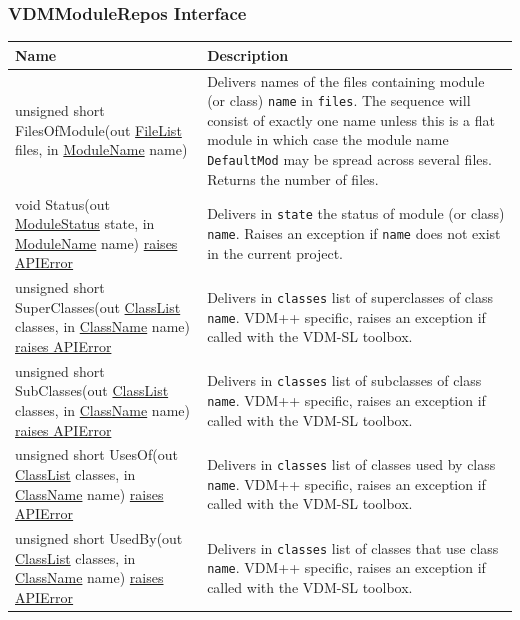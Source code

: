 \documentclass[\pformat,12pt]{article}
\newcommand{\vdmsl}{VDM-SL }
\newcommand{\vdmpp}{VDM++ }
\newcommand{\pbs}[1]{\let\temp=\\#1\let\\=\temp}
\newenvironment{interfacetable}{%
  \begin{longtable}{|>{\pbs\raggedright\ttfamily}p{6.6cm}%
                    |>{\pbs\raggedright}p{6.6cm}|} \hline
  \textrm{\bfseries Name} &  \textbf{Description} \\ \hline
  \endhead
  }{\end{longtable}}
\newcommand{\APIError}{\hyperlink{exception.APIError}{raises APIError}}
\newcommand{\ModuleName}{\hyperlink{type.ModuleName}{ModuleName}}
\newcommand{\ClassName}{\hyperlink{type.ClassName}{ClassName}}
\newcommand{\ClassList}{\hyperlink{type.ClassList}{ClassList}}
\newcommand{\FileList}{\hyperlink{type.FileList}{FileList}}
\newcommand{\ModuleStatus}{\hyperlink{struct.ModuleStatus}{ModuleStatus}}
\begin{document}
\subsubsection{VDMModuleRepos Interface}
\mbox{}
\begin{interfacetable}
unsigned short FilesOfModule(out {\FileList} files, in {\ModuleName} name)
 & Delivers names of the files containing module (or class)
   \texttt{name}  in \texttt{files}. The sequence will consist of
   exactly one name unless this is a flat module in which case the
   module name \texttt{DefaultMod} may be spread across several
   files. Returns the number of files.
\\ \hline
void Status(out {\ModuleStatus} state, in {\ModuleName} name) \APIError
 & Delivers in \texttt{state} the status of module (or class)
 \texttt{name}. Raises an exception if \texttt{name} does not exist in
 the current project.
\\ \hline
unsigned short SuperClasses(out {\ClassList} classes, in {\ClassName} name)
 \APIError 
 & Delivers in \texttt{classes} list of superclasses of class
   \texttt{name}. \vdmpp specific, raises an exception if called
   with the \vdmsl toolbox.
\\ \hline
unsigned short SubClasses(out {\ClassList} classes, in {\ClassName} name)
 \APIError
 & Delivers in \texttt{classes} list of subclasses of class
   \texttt{name}. \vdmpp specific, raises an exception if called
   with the \vdmsl toolbox.
\\ \hline
unsigned short UsesOf(out {\ClassList} classes, in {\ClassName} name)
 \APIError
 & Delivers in \texttt{classes} list of classes used by class
   \texttt{name}. \vdmpp specific, raises an exception if called
   with the \vdmsl toolbox.
\\ \hline
unsigned short UsedBy(out {\ClassList} classes, in {\ClassName} name)
 \APIError
 & Delivers in \texttt{classes} list of classes that use class
   \texttt{name}. \vdmpp specific, raises an exception if called
   with the \vdmsl toolbox.
\\ \hline
\end{interfacetable}
\end{document}
